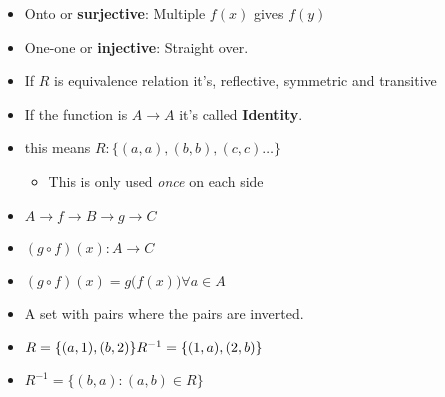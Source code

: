 \documentclass[english,10pt,a4paper]{article}
\begin{document}
\begin{theo} 
\begin{itemize}
\item Onto or \textbf{surjective}: Multiple $f(x)$ gives $f(y)$
\item One-one or \textbf{injective}: Straight over.
\end{itemize}
\end{theo}




\begin{theo} 
\begin{itemize}
\item If $R$ is equivalence relation it's,  reflective, symmetric and transitive
\item If the function is $A \rightarrow A$ it's called \textbf{Identity}.
\item this means $R: \{ (a,a),(b,b), (c,c)\ldots\}$
\begin{itemize}
\item This is only used \textit{once} on each side
\end{itemize}
\end{itemize}
\end{theo}


\begin{theo}[Composition] 
\begin{itemize}
\item $A \rightarrow f \rightarrow B \rightarrow g \rightarrow C$
\item $(g \circ f)(x): A \rightarrow C$
\item $(g \circ f)(x) = g\big(f(x)\big) \forall a \in A$
\end{itemize}
\end{theo}


\begin{theo}
\begin{itemize}
\item A set with pairs where the pairs are inverted.
\item $R = \{(a,1), (b,2)\}\\
	R^{-1}=\{(1,a),(2,b)\}$
\item $R^{-1}=\{ (b,a):(a,b) \in R\}$
\end{itemize}
\end{theo}
\end{document}
